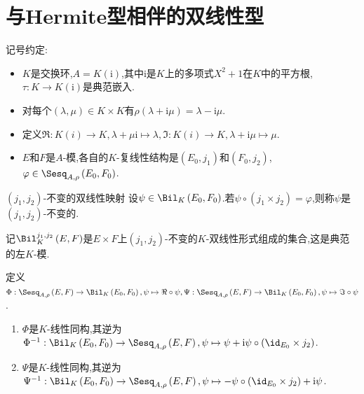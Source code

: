 \section{与Hermite型相伴的双线性型}

记号约定:
\begin{itemize}
	\item $K$是交换环,$A=K(\mathrm{i})$,其中$\mathrm{i}$是$K$上的多项式$X^{2}+1$在$K$中的平方根,$\tau:K\to K(\mathrm{i})$是典范嵌入.
	\item 对每个$\left(\lambda,\mu\right)\in K\times K$有$\rho\left(\lambda+\mathrm{i}\mu\right)=\lambda-\mathrm{i}\mu$.
	\item 定义$\Re:K(i)\to K,\lambda+\mu\mathrm{i}\mapsto\lambda,\Im:K(i)\to K,\lambda+\mathrm{i}\mu\mapsto\mu$.
	\item $E$和$F$是$A$-模,各自的$K$-复线性结构是$\left(E_{0},j_{1}\right)$和$\left(F_{0},j_{2}\right)$,$\varphi\in\Sesq_{A,\rho}\left(E_{0},F_{0}\right)$.
\end{itemize}

\begin{definition}{$\left(j_{1},j_{2}\right)$-不变的双线性映射}{}
	设$\psi\in\Bil_{K}\left(E_{0},F_{0}\right)$.若$\psi\circ\left(j_{1}\times j_{2}\right)=\varphi$,则称$\psi$是$\left(j_{1},j_{2}\right)$-不变的.
\end{definition}

\begin{definition}{}{}
	记$\Bil_{K}^{j_{1},j_{2}}\left(E,F\right)$是$E\times F$上$\left(j_{1},j_{2}\right)$-不变的$K$-双线性形式组成的集合,这是典范的左$K$-模.
\end{definition}

\begin{proposition}{}{}
	定义$\Phi:\Sesq_{A,\rho}\left(E,F\right)\to\Bil_{K}\left(E_{0},F_{0}\right),\psi\mapsto\Re\circ\psi,\Psi:\Sesq_{A,\rho}\left(E,F\right)\to\Bil_{K}\left(E_{0},F_{0}\right),\psi\mapsto\Im\circ\psi$.
	\begin{enumerate}
		\item $\Phi$是$K$-线性同构,其逆为$\Phi^{-1}:\Bil_{K}\left(E_{0},F_{0}\right)\to\Sesq_{A,\rho}\left(E,F\right),\psi\mapsto\psi+\mathrm{i}\psi\circ\left(\id_{E_{0}}\times j_{2}\right)$.
		\item $\Psi$是$K$-线性同构,其逆为$\Psi^{-1}:\Bil_{K}\left(E_{0},F_{0}\right)\to\Sesq_{A,\rho}\left(E,F\right),\psi\mapsto-\psi\circ\left(\id_{E_{0}}\times j_{2}\right)+\mathrm{i}\psi$.
	\end{enumerate}
\end{proposition}

